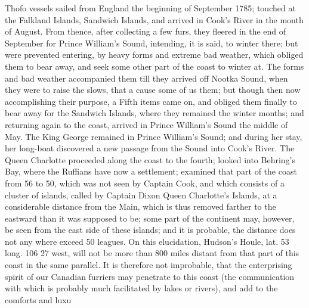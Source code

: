 \documentclass{article}
\begin{document}
Thofo vessels sailed from England the beginning of September 1785; touched at the Falkland Islands, Sandwich Islands, and arrived in Cook's River in the month of August. From thence, after collecting a few furs, they fleered in the end of September for Prince William's Sound, intending, it is said, to winter there; but were prevented entering, by heavy forms and extreme bad weather, which obliged them to bear away, and seek some other part of the coast to winter at. The forms and bad weather accompanied them till they arrived off Nootka Sound, when they were to raise the slows, that a cause some of us them; but though then now accomplishing their purpose, a Fifth items came on, and obliged them finally to bear away for the Sandwich Islands, where they remained the winter months; and returning again to the coast, arrived in Prince William's Sound the middle of May. The King George remained in Prince William's Sound; and during her stay, her long-boat discovered a new passage from the Sound into Cook's River. The Queen Charlotte proceeded along the coast to the fourth; looked into Behring's Bay, where the Ruffians have now a settlement; examined that part of the coast from 56 to 50, which was not seen by Captain Cook, and which consists of a cluster of islands, called by Captain Dixon Queen Charlotte's Islands, at a considerable distance from the Main, which is thus removed farther to the eastward than it was supposed to be; some part of the continent may, however, be seen from the east side of these islands; and it is probable, the distance does not any where exceed 50 leagues. On this elucidation, Hudson's Houle, lat. 53 long. 106 27 west, will not be more than 800 miles distant from that part of this coast in the same parallel. It is therefore not improbable, that the enterprising spirit of our Canadian furriers may penetrate to this coast (the communication with which is probably much facilitated by lakes or rivers), and add to the comforts and luxu
\end{document}
